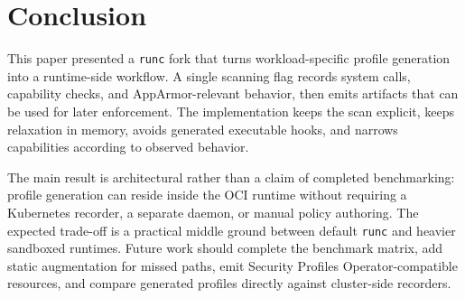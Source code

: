 \documentclass[runningheads]{llncs}
\begin{document}
\section{Conclusion}\label{sec:conclusion}

This paper presented a \texttt{runc} fork that turns workload-specific profile generation into a runtime-side workflow. A single scanning flag records system calls, capability checks, and AppArmor-relevant behavior, then emits artifacts that can be used for later enforcement. The implementation keeps the scan explicit, keeps relaxation in memory, avoids generated executable hooks, and narrows capabilities according to observed behavior.

The main result is architectural rather than a claim of completed benchmarking: profile generation can reside inside the OCI runtime without requiring a Kubernetes recorder, a separate daemon, or manual policy authoring. The expected trade-off is a practical middle ground between default \texttt{runc} and heavier sandboxed runtimes. Future work should complete the benchmark matrix, add static augmentation for missed paths, emit Security Profiles Operator-compatible resources, and compare generated profiles directly against cluster-side recorders.



\end{document}
